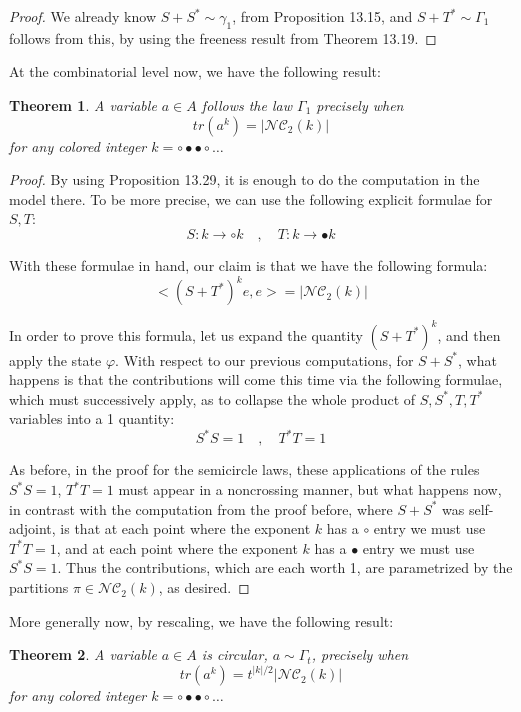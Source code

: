 \documentclass[12pt]{amsbook}
\newtheorem{theorem}{Theorem}[chapter]
\begin{document}
\begin{proof}
We already know $S+S^*\sim\gamma_1$, from Proposition 13.15, and $S+T^*\sim\Gamma_1$ follows from this, by using the freeness result from Theorem 13.19.
\end{proof}

At the combinatorial level now, we have the following result:


\begin{theorem}
A variable $a\in A$ follows the law $\Gamma_1$ precisely when
$$tr(a^k)=|\mathcal{NC}_2(k)|$$
for any colored integer $k=\circ\bullet\bullet\circ\ldots$
\end{theorem}

\begin{proof}
By using Proposition 13.29, it is enough to do the computation in the model there. To be more precise, we can use the following explicit formulae for $S,T$:
$$S:k\to\circ k\quad,\quad 
T:k\to\bullet k$$

With these formulae in hand, our claim is that we have the following formula:
$$<(S+T^*)^ke,e>=|\mathcal{NC}_2(k)|$$

In order to prove this formula, let us expand the quantity $(S+T^*)^k$, and then apply the state $\varphi$. With respect to our previous computations, for $S+S^*$, what happens is that the contributions will come this time via the following formulae, which must successively apply, as to collapse the whole product of $S,S^*,T,T^*$ variables into a 1 quantity:
$$S^*S=1\quad,\quad
T^*T=1$$

As before, in the proof for the semicircle laws, these applications of the rules $S^*S=1$, $T^*T=1$ must appear in a noncrossing manner, but what happens now, in contrast with the computation from the proof before, where $S+S^*$ was self-adjoint, is that at each point where the exponent $k$ has a $\circ$ entry we must use $T^*T=1$, and at each point where the exponent $k$ has a $\bullet$ entry we must use $S^*S=1$. Thus the contributions, which are each worth 1, are parametrized by the partitions $\pi\in\mathcal{NC}_2(k)$, as desired.
\end{proof}

More generally now, by rescaling, we have the following result:

\begin{theorem}
A variable $a\in A$ is circular, $a\sim\Gamma_t$, precisely when
$$tr(a^k)=t^{|k|/2}|\mathcal{NC}_2(k)|$$
for any colored integer $k=\circ\bullet\bullet\circ\ldots$
\end{theorem}
\end{document}
